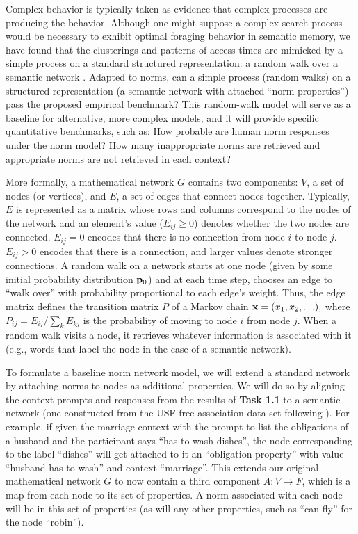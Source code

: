 \documentclass[12pt]{article}
\begin{document}
\noindent Complex behavior is typically taken as evidence that complex
processes are producing the behavior. Although one might suppose a
complex search process would be necessary to exhibit optimal foraging
behavior in semantic memory, we have found that the clusterings and
patterns of access times are mimicked by a simple process on a
standard structured representation: a random walk over a semantic
network \citep{abbott15}. Adapted to norms, can a simple process
(random walks) on a structured representation (a semantic network with
attached ``norm properties'') pass the proposed empirical benchmark?
This random-walk model will serve as a baseline for alternative, more
complex models, and it will provide specific quantitative benchmarks,
such as: How probable are human norm responses under the norm model?
How many inappropriate norms are retrieved and appropriate norms are
not retrieved in each context?

More formally, a mathematical network $G$ contains two components:
$V$, a set of nodes (or vertices), and $E$, a set of edges that
connect nodes together. Typically, $E$ is represented as a matrix
whose rows and columns correspond to the nodes of the network and an
element's value ($E_{ij} \geq 0$) denotes whether the two nodes are
connected. $E_{ij}=0$ encodes that there is no connection from node
$i$ to node $j$.  $E_{ij} > 0$ encodes that there is a connection, and
larger values denote stronger connections.  A random walk on a network
starts at one node (given by some initial probability distribution
${\bf p}_0$) and at each time step, chooses an edge to ``walk over''
with probability proportional to each edge's weight. Thus, the edge
matrix defines the transition matrix $P$ of a Markov chain
${\bf x} = (x_1, x_2, \ldots),$ where $P_{ij} = E_{ij}/\sum_k{E_{kj}}$
is the probability of moving to node $i$ from node $j$. When a random
walk visits a node, it retrieves whatever information is associated
with it (e.g., words that label the node in the case of a semantic
network).

To formulate a baseline norm network model, we will extend a standard
network by attaching norms to nodes as additional properties. We will
do so by aligning the context prompts and responses from the results
of {\bf Task 1.1} to a semantic network (one constructed from the USF
free association data set \citep{nelson04} following
\citep{abbott15}). For example, if given the marriage context with the
prompt to list the obligations of a husband and the participant says
``has to wash dishes'', the node corresponding to the label ``dishes''
will get attached to it an ``obligation property'' with value
``husband has to wash'' and context ``marriage''. This extends our
original mathematical network $G$ to now contain a third component
$A: V \rightarrow F$, which is a map from each node to its set of
properties. A norm associated with each node will be in this set of
properties (as will any other properties, such as ``can fly'' for the
node ``robin'').
\end{document}
